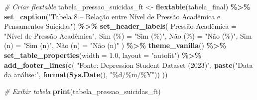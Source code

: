 \documentclass[
]{article}
\newenvironment{Shaded}{\begin{snugshade}}{\end{snugshade}}
\newcommand{\AttributeTok}[1]{\textcolor[rgb]{0.13,0.29,0.53}{#1}}
\newcommand{\CommentTok}[1]{\textcolor[rgb]{0.56,0.35,0.01}{\textit{#1}}}
\newcommand{\FloatTok}[1]{\textcolor[rgb]{0.00,0.00,0.81}{#1}}
\newcommand{\FunctionTok}[1]{\textcolor[rgb]{0.13,0.29,0.53}{\textbf{#1}}}
\newcommand{\NormalTok}[1]{#1}
\newcommand{\OtherTok}[1]{\textcolor[rgb]{0.56,0.35,0.01}{#1}}
\newcommand{\SpecialCharTok}[1]{\textcolor[rgb]{0.81,0.36,0.00}{\textbf{#1}}}
\newcommand{\StringTok}[1]{\textcolor[rgb]{0.31,0.60,0.02}{#1}}
\begin{document}
\begin{Shaded}
\begin{Highlighting}[]
\CommentTok{\# Criar flextable}
\NormalTok{tabela\_pressao\_suicidas\_ft }\OtherTok{\textless{}{-}} \FunctionTok{flextable}\NormalTok{(tabela\_final) }\SpecialCharTok{\%\textgreater{}\%}
  \FunctionTok{set\_caption}\NormalTok{(}\StringTok{"Tabela 8 – Relação entre Nível de Pressão Acadêmica e Pensamentos Suicidas"}\NormalTok{) }\SpecialCharTok{\%\textgreater{}\%}
  \FunctionTok{set\_header\_labels}\NormalTok{(}
    \StringTok{\textasciigrave{}}\AttributeTok{Pressão Acadêmica}\StringTok{\textasciigrave{}} \OtherTok{=} \StringTok{"Nível de Pressão Acadêmica"}\NormalTok{,}
    \StringTok{\textasciigrave{}}\AttributeTok{Sim (\%)}\StringTok{\textasciigrave{}} \OtherTok{=} \StringTok{"Sim (\%)"}\NormalTok{,}
    \StringTok{\textasciigrave{}}\AttributeTok{Não (\%)}\StringTok{\textasciigrave{}} \OtherTok{=} \StringTok{"Não (\%)"}\NormalTok{,}
    \StringTok{\textasciigrave{}}\AttributeTok{Sim (n)}\StringTok{\textasciigrave{}} \OtherTok{=} \StringTok{"Sim (n)"}\NormalTok{,}
    \StringTok{\textasciigrave{}}\AttributeTok{Não (n)}\StringTok{\textasciigrave{}} \OtherTok{=} \StringTok{"Não (n)"}
\NormalTok{  ) }\SpecialCharTok{\%\textgreater{}\%}
  \FunctionTok{theme\_vanilla}\NormalTok{() }\SpecialCharTok{\%\textgreater{}\%}
  \FunctionTok{set\_table\_properties}\NormalTok{(}\AttributeTok{width =} \FloatTok{1.0}\NormalTok{, }\AttributeTok{layout =} \StringTok{"autofit"}\NormalTok{) }\SpecialCharTok{\%\textgreater{}\%}
  \FunctionTok{add\_footer\_lines}\NormalTok{(}\FunctionTok{c}\NormalTok{(}
    \StringTok{"Fonte: Depression Student Dataset (2023)"}\NormalTok{,}
    \FunctionTok{paste}\NormalTok{(}\StringTok{"Data da análise:"}\NormalTok{, }\FunctionTok{format}\NormalTok{(}\FunctionTok{Sys.Date}\NormalTok{(), }\StringTok{"\%d/\%m/\%Y"}\NormalTok{))}
\NormalTok{  ))}

\CommentTok{\# Exibir tabela}
\FunctionTok{print}\NormalTok{(tabela\_pressao\_suicidas\_ft)}


\end{Highlighting}
\end{Shaded}
\end{document}
